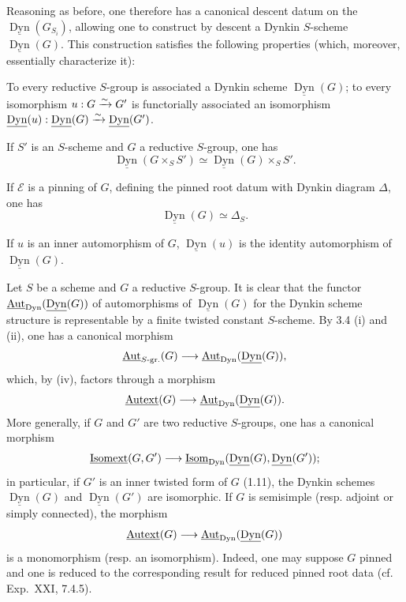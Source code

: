 Reasoning as before, one therefore has a canonical descent datum on the $\underline{\operatorname{Dyn}}(G_{S_i})$, allowing one to construct by descent a Dynkin $S$-scheme $\underline{\operatorname{Dyn}}(G)$.
\label{XXIV.3.4}
This construction satisfies the following properties (which, moreover, essentially characterize it):
\begin{enumeratei}
\item To every reductive $S$-group is associated a Dynkin scheme $\underline{\operatorname{Dyn}}(G)$; to every isomorphism $u:G\xrightarrow{\sim} G'$ is functorially associated an isomorphism $\underline{\operatorname{Dyn}}(u):\underline{\operatorname{Dyn}}(G)\xrightarrow{\sim}\underline{\operatorname{Dyn}}(G')$.
\item If $S'$ is an $S$-scheme and $G$ a reductive $S$-group, one has
\[
\underline{\operatorname{Dyn}}(G\times_S S')\simeq\underline{\operatorname{Dyn}}(G)\times_S S'.
\]
\item If $\mathscr E$ is a pinning of $G$, defining the pinned root datum with Dynkin diagram $\Delta$, one has
\[
\underline{\operatorname{Dyn}}(G)\simeq\Delta_S.
\]
\item If $u$ is an inner automorphism of $G$, $\underline{\operatorname{Dyn}}(u)$ is the identity automorphism of $\underline{\operatorname{Dyn}}(G)$.
\end{enumeratei}
\label{XXIV.3.5}
Let $S$ be a scheme and $G$ a reductive $S$-group. It is clear that the functor $\underline{\operatorname{Aut}}_{\mathrm{Dyn}}(\underline{\operatorname{Dyn}}(G))$ of automorphisms of $\underline{\operatorname{Dyn}}(G)$ for the Dynkin scheme structure is representable by a finite twisted constant $S$-scheme. By 3.4 (i) and (ii), one has a canonical morphism
\[
\underline{\operatorname{Aut}}_{S\text{-gr.}}(G)\longrightarrow\underline{\operatorname{Aut}}_{\mathrm{Dyn}}(\underline{\operatorname{Dyn}}(G)),
\]
which, by (iv), factors through a morphism
\[
\underline{\operatorname{Autext}}(G)\longrightarrow\underline{\operatorname{Aut}}_{\mathrm{Dyn}}(\underline{\operatorname{Dyn}}(G)).
\]
More generally, if $G$ and $G'$ are two reductive $S$-groups, one has a canonical morphism
\[
\underline{\operatorname{Isomext}}(G,G')\longrightarrow\underline{\operatorname{Isom}}_{\mathrm{Dyn}}(\underline{\operatorname{Dyn}}(G),\underline{\operatorname{Dyn}}(G'));
\]
in particular, if $G'$ is an inner twisted form of $G$ (1.11), the Dynkin schemes $\underline{\operatorname{Dyn}}(G)$ and $\underline{\operatorname{Dyn}}(G')$ are isomorphic.
\label{XXIV.3.6}
If $G$ is semisimple (resp. adjoint or simply connected), the morphism
\[
\underline{\operatorname{Autext}}(G)\longrightarrow\underline{\operatorname{Aut}}_{\mathrm{Dyn}}(\underline{\operatorname{Dyn}}(G))
\]
is a monomorphism (resp. an isomorphism). Indeed, one may suppose $G$ pinned and one is reduced to the corresponding result for reduced pinned root data (cf. Exp.~XXI, 7.4.5).

